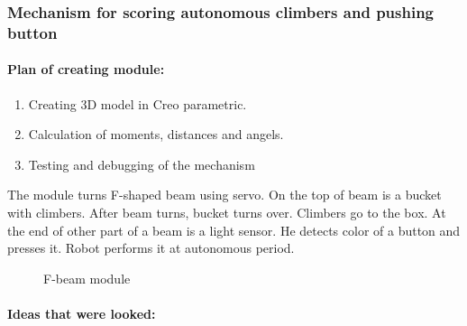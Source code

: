 \subsubsection{Mechanism for scoring autonomous climbers and pushing button}
\paragraph{Plan of creating module:}	
	
	\begin{enumerate}
		\item Creating 3D model in Creo parametric.
		\item Calculation of moments, distances and angels.
		\item Testing and debugging of the mechanism
	\end{enumerate}
	
	The module turns F-shaped beam using servo. On the top of beam is a bucket with climbers. After beam turns, bucket turns over. Climbers go to the box. At the end of other part of a beam is a light sensor. He detects color of a button and presses it. Robot performs it at autonomous period.
  \begin{figure}[H]
		\begin{minipage}[h]{\linewidth}
			\caption{F-beam module}
		\end{minipage}
	\end{figure}
	
	\paragraph{Ideas that were looked:}
	

